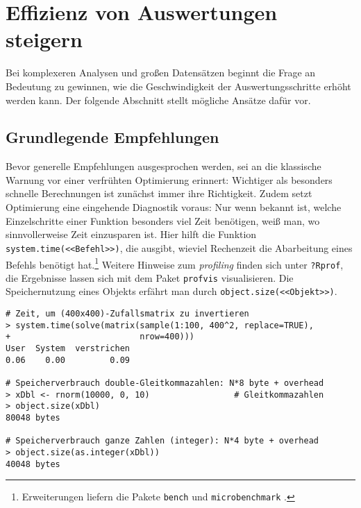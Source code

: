 \section{Effizienz von Auswertungen steigern}
\label{sec:performance}

Bei komplexeren Analysen und großen Datensätzen beginnt die Frage an Bedeutung zu gewinnen, wie die Geschwindigkeit der Auswertungsschritte erhöht werden kann. Der folgende Abschnitt stellt mögliche Ansätze dafür vor.

\subsection{Grundlegende Empfehlungen}
\label{sec:efficiency}

Bevor generelle Empfehlungen ausgesprochen werden, sei an die klassische Warnung vor einer verfrühten Optimierung erinnert: Wichtiger als besonders schnelle Berechnungen ist zunächst immer ihre Richtigkeit. Zudem setzt Optimierung eine eingehende Diagnostik voraus: Nur wenn bekannt ist, welche Einzelschritte einer Funktion besonders viel Zeit benötigen, weiß man, wo sinnvollerweise Zeit einzusparen ist. Hier hilft die Funktion \lstinline!system.time(<<Befehl>>)!, die ausgibt, wieviel Rechenzeit die Abarbeitung eines Befehls benötigt hat.\footnote{Erweiterungen liefern die Pakete  \lstinline!bench! \cite{Hester2019b} und  \lstinline!microbenchmark! \cite{Mersmann2023}.} Weitere Hinweise zum \emph{profiling} finden sich unter \lstinline!?Rprof!, die Ergebnisse lassen sich mit dem Paket  \lstinline!profvis! \cite{Chang2016} visualisieren. Die Speichernutzung eines Objekts erfährt man durch \lstinline!object.size(<<Objekt>>)!.
\begin{lstlisting}
# Zeit, um (400x400)-Zufallsmatrix zu invertieren
> system.time(solve(matrix(sample(1:100, 400^2, replace=TRUE),
+                          nrow=400)))
User  System  verstrichen
0.06    0.00         0.09

# Speicherverbrauch double-Gleitkommazahlen: N*8 byte + overhead
> xDbl <- rnorm(10000, 0, 10)                 # Gleitkommazahlen
> object.size(xDbl)
80048 bytes

# Speicherverbrauch ganze Zahlen (integer): N*4 byte + overhead
> object.size(as.integer(xDbl))
40048 bytes
\end{lstlisting}


